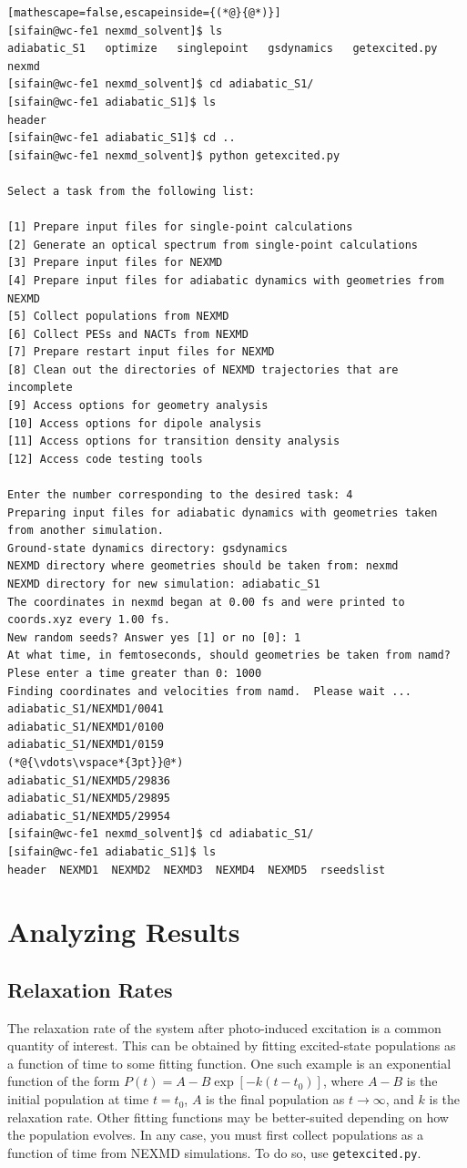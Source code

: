 \documentclass[letterpaper,12pt,titlepage]{article}
\begin{document}
\begin{lstlisting}[mathescape=false,escapeinside={(*@}{@*)}]
[sifain@wc-fe1 nexmd_solvent]$ ls
adiabatic_S1   optimize   singlepoint   gsdynamics   getexcited.py   nexmd
[sifain@wc-fe1 nexmd_solvent]$ cd adiabatic_S1/
[sifain@wc-fe1 adiabatic_S1]$ ls
header
[sifain@wc-fe1 adiabatic_S1]$ cd ..
[sifain@wc-fe1 nexmd_solvent]$ python getexcited.py 

Select a task from the following list:

[1] Prepare input files for single-point calculations
[2] Generate an optical spectrum from single-point calculations
[3] Prepare input files for NEXMD
[4] Prepare input files for adiabatic dynamics with geometries from NEXMD
[5] Collect populations from NEXMD
[6] Collect PESs and NACTs from NEXMD
[7] Prepare restart input files for NEXMD
[8] Clean out the directories of NEXMD trajectories that are incomplete
[9] Access options for geometry analysis
[10] Access options for dipole analysis
[11] Access options for transition density analysis
[12] Access code testing tools

Enter the number corresponding to the desired task: 4
Preparing input files for adiabatic dynamics with geometries taken from another simulation.
Ground-state dynamics directory: gsdynamics
NEXMD directory where geometries should be taken from: nexmd
NEXMD directory for new simulation: adiabatic_S1
The coordinates in nexmd began at 0.00 fs and were printed to coords.xyz every 1.00 fs.
New random seeds? Answer yes [1] or no [0]: 1
At what time, in femtoseconds, should geometries be taken from namd? 
Plese enter a time greater than 0: 1000
Finding coordinates and velocities from namd.  Please wait ...
adiabatic_S1/NEXMD1/0041
adiabatic_S1/NEXMD1/0100
adiabatic_S1/NEXMD1/0159
(*@{\vdots\vspace*{3pt}}@*)
adiabatic_S1/NEXMD5/29836
adiabatic_S1/NEXMD5/29895
adiabatic_S1/NEXMD5/29954
[sifain@wc-fe1 nexmd_solvent]$ cd adiabatic_S1/
[sifain@wc-fe1 adiabatic_S1]$ ls
header  NEXMD1  NEXMD2  NEXMD3  NEXMD4  NEXMD5  rseedslist
\end{lstlisting}

\newpage
\section{Analyzing Results}

\subsection{Relaxation Rates}
\label{relax_rate}
The relaxation rate of the system after photo-induced excitation is a common quantity of interest.  This can be obtained by fitting excited-state populations as a function of time to some fitting function.  One such example is an exponential function of the form $P\left(t\right)=A-B\exp\left[-k\left(t-t_{0}\right)\right]$, where $A-B$ is the initial population at time $t=t_{0}$, $A$ is the final population as $t\rightarrow\infty$, and $k$ is the relaxation rate.  Other fitting functions may be better-suited depending on how the population evolves.  In any case, you must first collect populations as a function of time from NEXMD simulations.  To do so, use \verb+getexcited.py+.
\end{document}
